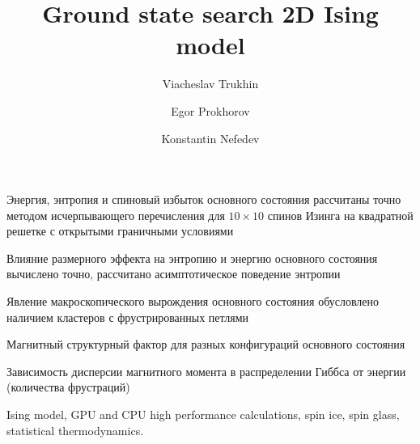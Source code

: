 \documentclass[utf8, babel, sor, jor, amsmath, amssymb, reprint]{elsarticle} %
\begin{document}
\begin{frontmatter}


\title{Ground state search 2D Ising model}

\author[mainaddress, secondaryaddress]{Viacheslav Trukhin}

\author[mainaddress]{Egor Prokhorov}

\author[mainaddress, secondaryaddress]{Konstantin Nefedev}


\address[mainaddress]{Far Eastern Federal University, Vladivostok, Russky Island, 10 Ajax Bay, 690922, the Russian Federation}
\address[secondaryaddress]{Institute of Applied Mathematics, Far Eastern Branch, Russian Academy of Science, Vladivostok, Radio 7, 690041, the Russian Federation}

\begin{abstract}


\end{abstract}


\begin{highlights}
	\item Энергия, энтропия и спиновый избыток основного состояния рассчитаны точно методом исчерпывающего перечисления для $10 \times 10$ спинов Изинга на квадратной решетке с открытыми граничными условиями
	\item Влияние размерного эффекта на энтропию и энергию основного состояния вычислено точно, рассчитано асимптотическое поведение энтропии
	\item Явление макроскопического вырождения основного состояния обусловлено наличием кластеров с фрустрированных петлями
	\item Магнитный структурный фактор для разных конфигураций основного состояния
	\item Зависимость дисперсии магнитного момента в распределении Гиббса от энергии (количества фрустраций)
\end{highlights}


\begin{keyword}
	Ising model, GPU and CPU high performance calculations, spin ice, spin glass, statistical thermodynamics.
\end{keyword}


\end{frontmatter}

\linenumbers
\newpage
\tableofcontents
\end{document}
